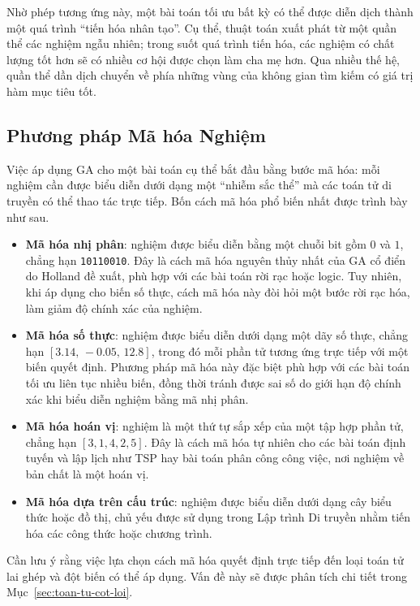 Nhờ phép tương ứng này, một bài toán tối ưu bất kỳ có thể được diễn
dịch thành một quá trình ``tiến hóa nhân tạo''. Cụ thể, thuật toán xuất
phát từ một quần thể các nghiệm ngẫu nhiên; trong suốt quá trình tiến
hóa, các nghiệm có chất lượng tốt hơn sẽ có nhiều cơ hội được chọn
làm cha mẹ hơn. Qua nhiều thế hệ, quần thể dần dịch chuyển về phía
những vùng của không gian tìm kiếm có giá trị hàm mục tiêu tốt.

\subsection*{Phương pháp Mã hóa Nghiệm}
\label{subsec:ma-hoa}

Việc áp dụng GA cho một bài toán cụ thể bắt đầu bằng bước mã hóa: mỗi
nghiệm cần được biểu diễn dưới dạng một ``nhiễm sắc thể'' mà các
toán tử di truyền có thể thao tác trực tiếp. Bốn cách mã hóa phổ biến
nhất được trình bày như sau.

\begin{itemize}
    \item \textbf{Mã hóa nhị phân}: nghiệm được
    biểu diễn bằng một chuỗi bit gồm $0$ và $1$, chẳng hạn
    \texttt{10110010}. Đây là cách mã hóa nguyên thủy nhất của GA cổ
    điển do Holland đề xuất, phù hợp với các bài toán rời rạc hoặc
    logic. Tuy nhiên, khi áp dụng cho biến số thực, cách mã hóa này
    đòi hỏi một bước rời rạc hóa, làm giảm độ chính xác của nghiệm.
    \item \textbf{Mã hóa số thực}: nghiệm được biểu diễn dưới dạng một
    dãy số thực, chẳng hạn $[3.14,\, -0.05,\, 12.8]$, trong đó mỗi phần
    tử tương ứng trực tiếp với một biến quyết định. Phương pháp mã hóa
    này đặc biệt phù hợp với các bài toán tối ưu liên tục nhiều biến,
    đồng thời tránh được sai số do giới hạn độ chính xác khi biểu diễn
    nghiệm bằng mã nhị phân.
    \item \textbf{Mã hóa hoán vị}: nghiệm là
    một thứ tự sắp xếp của một tập hợp phần tử, chẳng hạn
    $[3, 1, 4, 2, 5]$. Đây là cách mã hóa tự nhiên cho các bài toán
    định tuyến và lập lịch như TSP hay bài toán phân công công việc,
    nơi nghiệm về bản chất là một hoán vị.
    \item \textbf{Mã hóa dựa trên cấu trúc}:
    nghiệm được biểu diễn dưới dạng cây biểu thức hoặc đồ thị, chủ
    yếu được sử dụng trong Lập trình Di truyền nhằm tiến hóa các công
    thức hoặc chương trình.
\end{itemize}

Cần lưu ý rằng việc lựa chọn cách mã hóa quyết định trực tiếp đến loại
toán tử lai ghép và đột biến có thể áp dụng. Vấn đề này sẽ được phân
tích chi tiết trong Mục~\ref{sec:toan-tu-cot-loi}.


